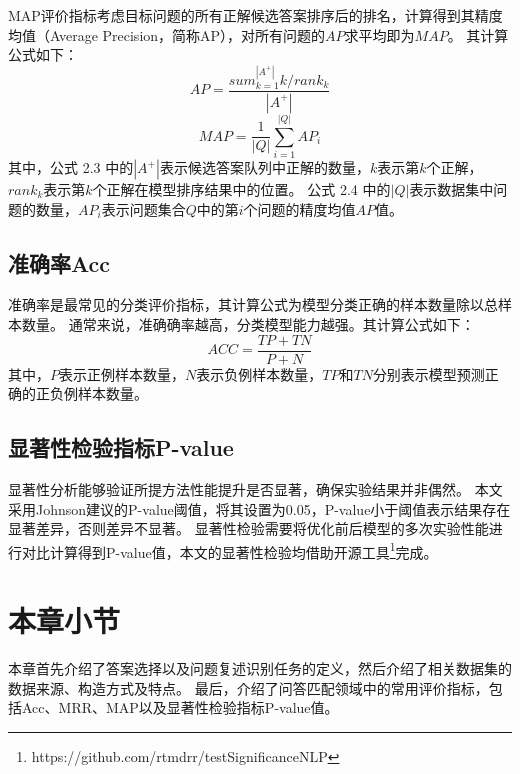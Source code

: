 MAP评价指标考虑目标问题的所有正解候选答案排序后的排名，计算得到其精度均值（Average Precision，简称AP），对所有问题的$AP$求平均即为$MAP$。
其计算公式如下：
\begin{equation}
    AP = \frac{sum_{k=1}^{|A^+|}k/rank_k}{|A^+|}
\end{equation}
\begin{equation}
    MAP = \frac{1}{|Q|} \sum_{i=1}^{|Q|}AP_i
\end{equation}
其中，公式 2.3 中的$|A^+|$表示候选答案队列中正解的数量，$k$表示第$k$个正解，$rank_k$表示第$k$个正解在模型排序结果中的位置。
公式 2.4 中的$|Q|$表示数据集中问题的数量，$AP_i$表示问题集合$Q$中的第$i$个问题的精度均值$AP$值。

\subsection{准确率Acc}

准确率是最常见的分类评价指标，其计算公式为模型分类正确的样本数量除以总样本数量。
通常来说，准确确率越高，分类模型能力越强。其计算公式如下：
\begin{equation}
    ACC = \frac{TP + TN}{P + N}
\end{equation}
其中，$P$表示正例样本数量，$N$表示负例样本数量，$TP$和$TN$分别表示模型预测正确的正负例样本数量。


\subsection{显著性检验指标P-value}

显著性分析能够验证所提方法性能提升是否显著，确保实验结果并非偶然。
本文采用Johnson\cite{johnson1999insignificance}建议的P-value阈值，将其设置为0.05，P-value小于阈值表示结果存在显著差异，否则差异不显著。
显著性检验需要将优化前后模型的多次实验性能进行对比计算得到P-value值，本文的显著性检验均借助开源工具\footnote{https://github.com/rtmdrr/testSignificanceNLP}完成。

\section{本章小节}

本章首先介绍了答案选择以及问题复述识别任务的定义，然后介绍了相关数据集的数据来源、构造方式及特点。
最后，介绍了问答匹配领域中的常用评价指标，包括Acc、MRR、MAP以及显著性检验指标P-value值。